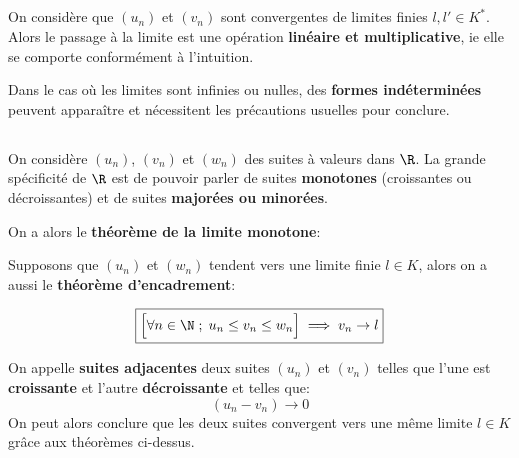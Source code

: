 \subsection*{}
On considère que \((u_n)\) et \((v_n)\) sont convergentes de limites finies \(l, l' \in K^*\).\+
Alors le passage à la limite est une opération \textbf{linéaire et multiplicative}, ie elle se comporte conformément à l'intuition.\<

Dans le cas où les limites sont infinies ou nulles, des \textbf{formes indéterminées} peuvent apparaître et nécessitent les précautions usuelles pour conclure.

\subsection*{}
On considère \((u_n)\), \((v_n)\) et \((w_n)\) des suites à valeurs dans \(\R\). La grande spécificité de \(\R\) est de pouvoir parler de suites \textbf{monotones} (croissantes ou décroissantes) et de suites \textbf{majorées ou minorées}.\<

On a alors le \textbf{théorème de la limite monotone}:

Supposons que \((u_n)\) et \((w_n)\) tendent vers une limite finie \(l \in K\), alors on a aussi le \textbf{théorème d'encadrement}:

\[
    \boxed{
            \Bigr[\forall n \in \N \; ; \; u_n \leq v_n \leq w_n \Bigr] \implies v_n \rightarrow l
    }
\]

On appelle \textbf{suites adjacentes} deux suites \((u_n)\) et \((v_n)\) telles que l'une est \textbf{croissante} et l'autre \textbf{décroissante} et telles que:
\[
    (u_n - v_n) \rightarrow 0
\]
On peut alors conclure que les deux suites convergent vers une même limite \(l \in K\) grâce aux théorèmes ci-dessus.


